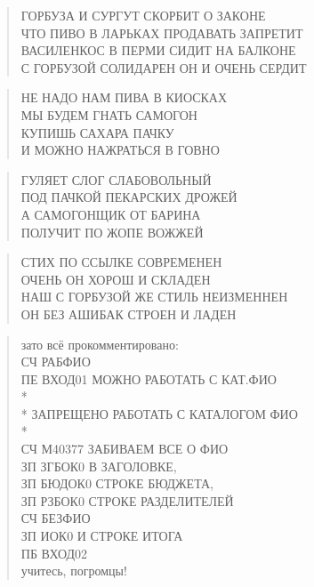 \poemtitle{***}
\begin{verse}
ГОРБУЗА И СУРГУТ СКОРБИТ О ЗАКОНЕ\\
ЧТО ПИВО В ЛАРЬКАХ ПРОДАВАТЬ ЗАПРЕТИТ\\
ВАСИЛЕНКОС В ПЕРМИ СИДИТ НА БАЛКОНЕ\\
С ГОРБУЗОЙ СОЛИДАРЕН ОН И ОЧЕНЬ СЕРДИТ
\end{verse}

\poemtitle{***}
\begin{verse}
НЕ НАДО НАМ ПИВА В КИОСКАХ\\
МЫ БУДЕМ ГНАТЬ САМОГОН\\
КУПИШЬ САХАРА ПАЧКУ\\
И МОЖНО НАЖРАТЬСЯ В ГОВНО
\end{verse}

\poemtitle{***}
\begin{verse}
ГУЛЯЕТ СЛОГ СЛАБОВОЛЬНЫЙ\\
ПОД ПАЧКОЙ ПЕКАРСКИХ ДРОЖЕЙ\\
А САМОГОНЩИК ОТ БАРИНА\\
ПОЛУЧИТ ПО ЖОПЕ ВОЖЖЕЙ
\end{verse}

\poemtitle{***}
\begin{verse}
СТИХ ПО ССЫЛКЕ СОВРЕМЕНЕН\\
ОЧЕНЬ ОН ХОРОШ И СКЛАДЕН\\
НАШ С ГОРБУЗОЙ ЖЕ СТИЛЬ НЕИЗМЕННЕН\\
ОН БЕЗ АШИБАК СТРОЕН И ЛАДЕН
\end{verse}

\poemtitle{***}
\begin{verse}
зато всё прокомментировано:\\
 СЧ РАБФИО\\
 ПЕ ВХОД01  МОЖНО РАБОТАТЬ С КАТ.ФИО\\
*\\
*  ЗАПРЕЩЕНО РАБОТАТЬ С КАТАЛОГОМ ФИО\\
*\\
 СЧ М40377    ЗАБИВАЕМ ВСЕ О ФИО\\
 ЗП ЗГБОК0  В ЗАГОЛОВКЕ,\\
 ЗП БЮДОК0  СТРОКЕ БЮДЖЕТА,\\
 ЗП РЗБОК0  СТРОКЕ РАЗДЕЛИТЕЛЕЙ\\
 СЧ БЕЗФИО\\
 ЗП ИОК0    И СТРОКЕ ИТОГА\\
 ПБ ВХОД02\\
учитесь, погромцы!
\end{verse}

